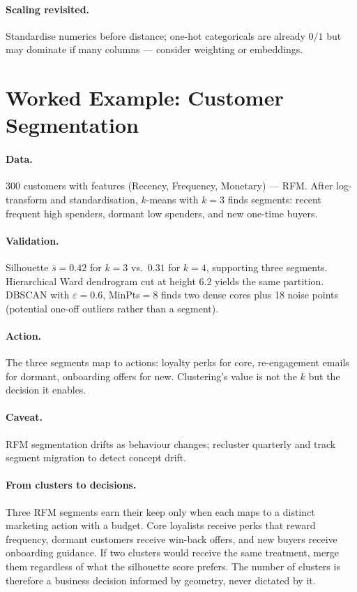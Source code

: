 \paragraph{Scaling revisited.} Standardise numerics before distance; one-hot categoricals are already $0/1$ but may dominate if many columns --- consider weighting or embeddings.

\section{Worked Example: Customer Segmentation}
\label{sec:segment}
\paragraph{Data.} 300 customers with features (Recency, Frequency, Monetary) --- RFM. After log-transform and standardisation, $k$-means with $k=3$ finds segments: recent frequent high spenders, dormant low spenders, and new one-time buyers.

\paragraph{Validation.} Silhouette $\bar{s}=0.42$ for $k=3$ vs.\ $0.31$ for $k=4$, supporting three segments. Hierarchical Ward dendrogram cut at height $6.2$ yields the same partition. DBSCAN with $\varepsilon=0.6$, MinPts$=8$ finds two dense cores plus 18 noise points (potential one-off outliers rather than a segment).

\paragraph{Action.} The three segments map to actions: loyalty perks for core, re-engagement emails for dormant, onboarding offers for new. Clustering's value is not the $k$ but the decision it enables.

\paragraph{Caveat.} RFM segmentation drifts as behaviour changes; recluster quarterly and track segment migration to detect concept drift.
\paragraph{From clusters to decisions.} Three RFM segments earn their keep only when each maps to a distinct marketing action with a budget.
Core loyalists receive perks that reward frequency, dormant customers receive win-back offers, and new buyers receive onboarding guidance.
If two clusters would receive the same treatment, merge them regardless of what the silhouette score prefers.
The number of clusters is therefore a business decision informed by geometry, never dictated by it.

